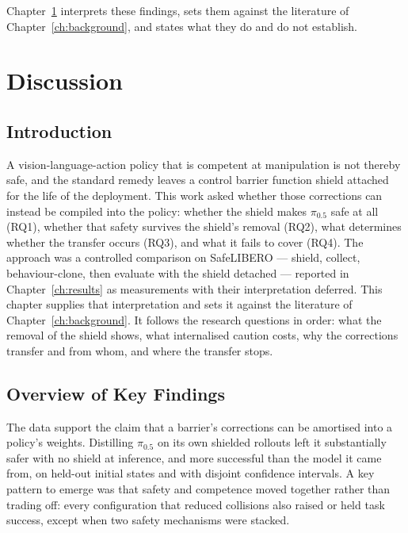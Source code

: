 \documentclass[a4paper,11pt]{report}
\begin{document}
Chapter~\ref{ch:discussion} interprets these findings, sets them against the literature of
Chapter~\ref{ch:background}, and states what they do and do not establish.



\chapter{Discussion}\label{ch:discussion}

\section{Introduction}\label{sec:disc:intro}

A vision-language-action policy that is competent at manipulation is not thereby safe, and the
standard remedy leaves a control barrier function shield attached for the life of the deployment.
This work asked whether those corrections can instead be compiled into the policy: whether the
shield makes $\pi_{0.5}$ safe at all (RQ1), whether that safety survives the shield's removal
(RQ2), what determines whether the transfer occurs (RQ3), and what it fails to cover (RQ4). The
approach was a controlled comparison on SafeLIBERO --- shield, collect, behaviour-clone, then
evaluate with the shield detached --- reported in Chapter~\ref{ch:results} as measurements with
their interpretation deferred. This chapter supplies that interpretation and sets it against the
literature of Chapter~\ref{ch:background}. It follows the research questions in order: what the
removal of the shield shows, what internalised caution costs, why the corrections transfer and from
whom, and where the transfer stops.

\section{Overview of Key Findings}\label{sec:disc:overview}

The data support the claim that a barrier's corrections can be amortised into a policy's weights.
Distilling $\pi_{0.5}$ on its own shielded rollouts left it substantially safer with no shield at
inference, and more successful than the model it came from, on held-out initial states and with
disjoint confidence intervals. A key pattern to emerge was that safety and competence moved
together rather than trading off: every configuration that reduced collisions also raised or held
task success, except when two safety mechanisms were stacked.
\end{document}
